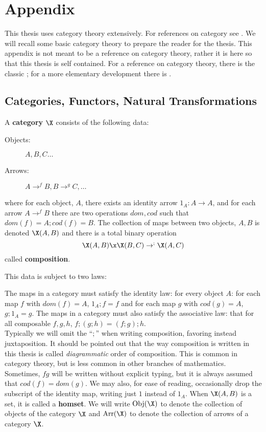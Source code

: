 \fancyhead[RO,LE]{\thepage}
\fancyfoot{} 
\chapter{Appendix}

This thesis uses category theory extensively.  For references on category see \cite{CatsOG}.  We will recall some basic category theory to prepare the reader for the thesis.  This appendix is not meant to be a reference on category theory, rather it is here so that this thesis is self contained.  For a reference on category theory, there is the classic \cite{CatsOG}; for a more elementary development there is \cite{CatsAwodey}.

\section{Categories, Functors, Natural Transformations}

\begin{defn}
 A {\bf category} $\X$ consists of the following data:
\end{defn}
\begin{description}
 \item[Objects: ] $A,B,C \ldots$
 \item[Arrows: ] $A \to^{f} B,B \to^{g} C, \ldots$
\end{description}
where for each object, $A$, there exists an identity arrow $1_A : A \to A$, and for each arrow $A \to^{f} B$ there are two operations $dom,cod$ such that $dom(f)=A;cod(f)=B$.  The collection of maps between two objects, $A,B$ is denoted $\X(A,B)$ and there is a total binary operation
$$ \X(A,B) \x \X(B,C) \to^{;} \X(A,C)$$
called {\bf composition}.  


This data is subject to two laws:


The maps in a category must satisfy the identity law: for every object $A$: for each map $f$ with $dom(f)=A$, $1_A ; f = f$ and for each map $g$ with $cod(g)=A$, $g;1_A = g$.  The maps in a category must also satisfy the associative law: that for all composable $f,g,h$, $f;(g;h) = (f;g);h$.\\


Typically we will omit the ``$;$'' when writing composition, favoring instead juxtaposition.  It should be pointed out that the way composition is written in this thesis is called \emph{diagrammatic} order of composition.  This is common in category theory, but is less common in other branches of mathematics.  Sometimes, $fg$ will be written without explicit typing, but it is always assumed that $cod(f) = dom(g)$.  We may also, for ease of reading, occasionally drop the subscript of the identity map, writing just $1$ instead of $1_A$.  When $\X(A,B)$ is a set, it is called a {\bf homset}.  We will write $\text{Obj}(\X)$ to denote the collection of objects of the category $\X$ and $\text{Arr}(\X)$ to denote the collection of arrows of a category $\X$.



